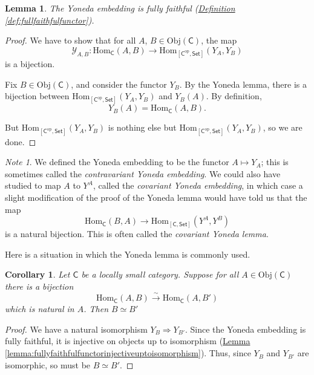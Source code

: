 \documentclass[a4paper,10pt]{scrreprt}
\newcommand{\Obj}{\mathrm{Obj}}
\newcommand{\Hom}{\mathrm{Hom}}
\theoremstyle{definition}
\theoremstyle{plain}
\newtheorem{lemma}{Lemma}[section]
\newtheorem{corollary}{Corollary}[section]
\theoremstyle{remark}
\newtheorem{note}{Note}[section]
\begin{document}
\begin{lemma}
  The Yoneda embedding is fully faithful (\hyperref[def:fullfaithfulfunctor]{Definition \ref*{def:fullfaithfulfunctor}}).
\end{lemma}
\begin{proof}
  We have to show that for all $A$, $B \in \Obj(\mathsf{C})$, the map
  \begin{equation*}
    \mathcal{Y}_{A, B}\colon \Hom_{\mathsf{C}}(A, B) \to \Hom_{[\mathsf{C}^{\mathrm{op}}, \mathsf{Set}]}(Y_{A}, Y_{B})
  \end{equation*}
  is a bijection.

  Fix $B \in \Obj(\mathsf{C})$, and consider the functor $Y_{B}$. By the Yoneda lemma, there is a bijection between $\Hom_{[\mathsf{C}^{\text{op}}, \mathsf{Set}]}(Y_{A}, Y_{B})$ and $Y_{B}(A)$. By definition,
  \begin{equation*}
    Y_{B}(A) = \Hom_{\mathsf{C}}(A, B).
  \end{equation*}

  But $\Hom_{[\mathsf{C}^{\text{op}}, \mathsf{Set}]}(Y_{A}, Y_{B})$ is nothing else but $\Hom_{[\mathsf{C}^{\mathrm{op}}, \mathsf{Set}]}(Y_{A}, Y_{B})$, so we are done.
\end{proof}

\begin{note}
  We defined the Yoneda embedding to be the functor $A \mapsto Y_{A}$; this is sometimes called the \emph{contravariant Yoneda embedding}. We could also have studied to map $A$ to $Y^{A}$, called the \emph{covariant Yoneda embedding}, in which case a slight modification of the proof of the Yoneda lemma would have told us that the map
  \begin{equation*}
    \Hom_{\mathsf{C}}(B, A) \to \Hom_{[\mathsf{C}, \mathsf{Set}]}(Y^{A}, Y^{B})
  \end{equation*}
  is a natural bijection. This is often called the \emph{covariant Yoneda lemma}.
\end{note}

Here is a situation in which the Yoneda lemma is commonly used.
\begin{corollary}
  \label{cor:yonedaembeddingrespectsisomorphisms}
  Let $\mathsf{C}$ be a locally small category. Suppose for all $A \in \Obj(\mathsf{C})$ there is a bijection
  \begin{equation*}
    \Hom_{\mathsf{C}}(A, B) \stackrel{\sim}{\to} \Hom_{\mathsf{C}}(A, B')
  \end{equation*}
  which is natural in $A$. Then $B \simeq B'$
\end{corollary}
\begin{proof}
  We have a natural isomorphism $Y_{B} \Rightarrow Y_{B'}$. Since the Yoneda embedding is fully faithful, it is injective on objects up to isomorphism (\hyperref[lemma:fullyfaithfulfunctorinjectiveuptoisomorphism]{Lemma \ref*{lemma:fullyfaithfulfunctorinjectiveuptoisomorphism}}). Thus, since $Y_{B}$ and $Y_{B'}$ are isomorphic, so must be $B \simeq B'$.
\end{proof}
\end{document}
